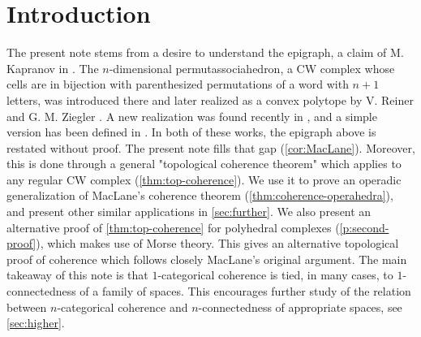 
\section*{Introduction} 
\label{s:introduction}

The present note stems from a desire to understand the epigraph, a claim of M. Kapranov in \cite{kapranov1993}. 
The $n$-dimensional permutassociahedron, a CW complex whose cells are in bijection with parenthesized permutations of a word with $n+1$ letters, was introduced there and later realized as a convex polytope by V. Reiner and G. M. Ziegler \cite{reinerCoxeterassociahedra1994}. 
A new realization was found recently in \cite{CastilloLiu21}, and a simple version has been defined in \cite{baralicSimplePermutoassociahedron2019}.
In both of these works, the epigraph above is restated without proof. 
The present note fills that gap (\cref{cor:MacLane}).
Moreover, this is done through a general "topological coherence theorem" which applies to any regular CW complex (\cref{thm:top-coherence}).
We use it to prove an operadic generalization of MacLane's coherence theorem (\cref{thm:coherence-operahedra}), and present other similar applications in \cref{sec:further}. 
We also present an alternative proof of \cref{thm:top-coherence} for polyhedral complexes (\cref{p:second-proof}), which makes use of Morse theory. 
This gives an alternative topological proof of coherence which follows closely MacLane's original argument. 
The main takeaway of this note is that $1$-categorical coherence is tied, in many cases, to $1$-connectedness of a family of spaces. 
This encourages further study of the relation between $n$-categorical coherence and $n$-connectedness of appropriate spaces, see \cref{sec:higher}.



